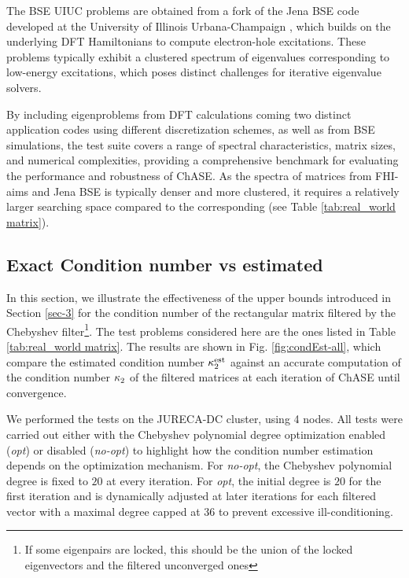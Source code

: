 The BSE UIUC problems are obtained from a fork of the Jena BSE code developed at the University of Illinois Urbana-Champaign \cite{zhang2021solving}, which builds on the underlying DFT Hamiltonians to compute electron-hole excitations. These problems typically exhibit a clustered spectrum of eigenvalues corresponding to low-energy excitations, which poses distinct challenges for iterative eigenvalue solvers.

By including eigenproblems from DFT calculations coming two distinct application codes using different discretization schemes, as well as from BSE simulations, the test suite  covers a range of spectral characteristics, matrix sizes, and numerical complexities, providing a comprehensive benchmark for evaluating the performance and robustness of ChASE. As the spectra of matrices from FHI-aims and Jena BSE is typically denser and more clustered, it requires a relatively larger searching space \nex compared to the corresponding \nev (see Table \ref{tab:real_world matrix}).

\subsection{Exact Condition number vs estimated}

In this section, we illustrate the effectiveness of the upper bounds introduced in Section \ref{sec-3} for the condition number of the rectangular matrix filtered by the Chebyshev filter\footnote{If some eigenpairs are locked, this should be the union of the locked eigenvectors and the filtered unconverged ones}. The test problems considered here are the ones listed in Table \ref{tab:real_world matrix}. The results are shown in Fig. \ref{fig:condEst-all}, which compare the estimated condition number $\mathop\mathrm{\kappa}_2^\mathrm{est}\nolimits$ against an accurate computation of the condition number $\mathop\mathrm{\kappa}_2\nolimits$ of the filtered matrices at each iteration of ChASE until convergence.

We performed the tests on the JURECA-DC cluster, using 4 nodes. All tests were carried out either with the Chebyshev polynomial degree optimization enabled ({\it opt}) or disabled ({\it no-opt}) to highlight how the condition number estimation depends on the optimization mechanism. For {\it no-opt}, the Chebyshev polynomial degree is fixed to $20$ at every iteration. For {\it opt}, the initial degree is $20$ for the first iteration and is dynamically adjusted at later iterations for each filtered vector with a maximal degree capped at $36$ to prevent excessive ill-conditioning.

